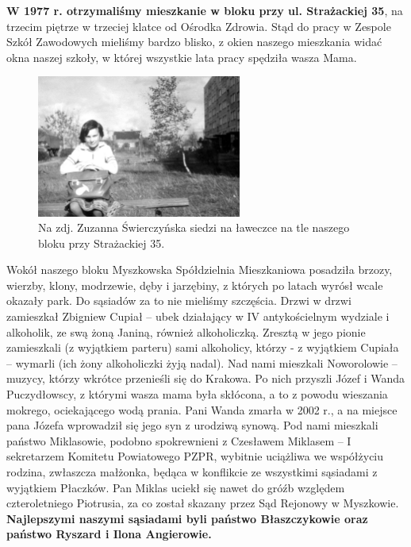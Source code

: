 \textbf{W 1977 r. otrzymaliśmy mieszkanie w bloku przy ul. Strażackiej 35}, na trzecim piętrze w trzeciej klatce od Ośrodka Zdrowia. Stąd do pracy w Zespole Szkół Zawodowych mieliśmy bardzo blisko, z okien naszego mieszkania widać okna naszej szkoły, w której wszystkie lata pracy spędziła wasza Mama.
\begin{figure}[!h]
\begin{center}
\includegraphics[width=0.6\textwidth]{photo/zuzia_swierczynska_1.jpg}
\caption[Zuzanna Świerczyńska na tle naszego bloku przy Strażackiej 35]{Na zdj. Zuzanna Świerczyńska siedzi na ławeczce na tle naszego bloku przy Strażackiej 35.}
\end{center}
\end{figure}

Wokół naszego bloku Myszkowska Spółdzielnia Mieszkaniowa posadziła brzozy,  wierzby, klony, modrzewie, dęby i jarzębiny, z których po latach wyrósł wcale okazały park. Do sąsiadów za to nie mieliśmy szczęścia. Drzwi w drzwi zamieszkał Zbigniew Cupiał – ubek działający w IV antykościelnym wydziale i alkoholik, ze swą żoną Janiną, również alkoholiczką. Zresztą w jego pionie zamieszkali (z wyjątkiem parteru) sami alkoholicy, którzy - z wyjątkiem Cupiała – wymarli (ich żony alkoholiczki żyją nadal). Nad nami mieszkali Noworolowie – muzycy, którzy wkrótce przenieśli się do Krakowa. Po nich przyszli Józef i Wanda Puczydłowscy, z którymi wasza mama była skłócona, a to z powodu wieszania mokrego, ociekającego wodą prania. Pani Wanda zmarła w 2002 r., a na miejsce pana Józefa wprowadził się jego syn z urodziwą synową. Pod nami mieszkali państwo Miklasowie, podobno spokrewnieni z Czesławem Miklasem – I sekretarzem Komitetu Powiatowego PZPR, wybitnie uciążliwa we współżyciu rodzina, zwłaszcza małżonka, będąca w konflikcie ze wszystkimi sąsiadami z wyjątkiem Płaczków. Pan Miklas uciekł się nawet do gróźb względem czteroletniego Piotrusia, za co został skazany przez Sąd Rejonowy w Myszkowie. \textbf{Najlepszymi naszymi sąsiadami byli państwo Błaszczykowie oraz państwo Ryszard i Ilona Angierowie.}

